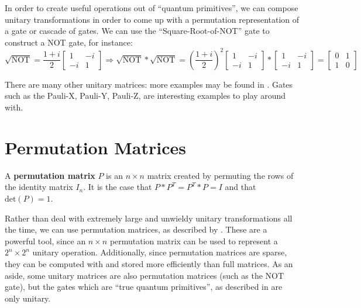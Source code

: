 In order to create useful operations out of ``quantum primitives'', we can compose unitary transformations in order to come up with a permutation representation of a gate or cascade of gates. We can use the ``Square-Root-of-NOT'' gate to construct a NOT gate, for instance:
\[ \sqrt{\text{NOT}} = \frac{1+i}{2}
  \left[
  \begin{matrix}
   1 & -i \\
   -i & 1
  \end{matrix}
  \right] \Rightarrow
  \sqrt{\text{NOT}}*\sqrt{\text{NOT}} = \left(\frac{1+i}{2}\right)^{2} \left[
  \begin{matrix}
   1 & -i \\
   -i & 1
  \end{matrix}
  \right] *
  \left[
  \begin{matrix}
   1 & -i \\
   -i & 1
  \end{matrix}
  \right] =
  \left[
  \begin{matrix}
   0 & 1 \\
   1 & 0
  \end{matrix}
  \right]
\]

There are many other unitary matrices: more examples may be found in \cite{Lukac2003}. Gates such as the Pauli-X, Pauli-Y, Pauli-Z, are interesting examples to play around with. 


\section{Permutation Matrices}
\begin{mydef}
 A {\bf permutation matrix} $P$ is an $n \times n$ matrix created by permuting the rows of the identity matrix $I_{n}$. It is the case that $P*P^{T}=P^{T}*P=I$ and that $\text{det}(P)=1$. 
\end{mydef}

Rather than deal with extremely large and unwieldy unitary transformations all the time, we can use permutation matrices, as described by \cite{Williams1999}. These are a powerful tool, since an $n \times n$ permutation matrix can be used to represent a $2^{n} \times 2^{n}$ unitary operation. Additionally, since permutation matrices are sparse, they can be computed with and stored more efficiently than full matrices. As an aside, some unitary matrices are also permutation matrices (such as the NOT gate), but the gates which are ``true quantum primitives'', as described in \cite{Lukac2003} are only unitary. \\

